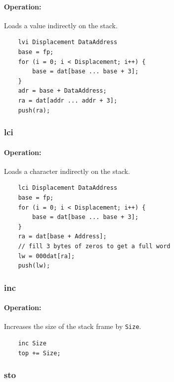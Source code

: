 \paragraph{Operation:}
Loads a value indirectly on the stack.

	\begin{lstlisting}
	lvi Displacement DataAddress
	base = fp;
	for (i = 0; i < Displacement; i++) {
		base = dat[base ... base + 3];
	}
	adr = base + DataAddress;
	ra = dat[addr ... addr + 3];
	push(ra);
	\end{lstlisting}

\subsubsection{lci}

\paragraph{Operation:}
Loads a character indirectly on the stack.

	\begin{lstlisting}
	lci Displacement DataAddress
	base = fp;
	for (i = 0; i < Displacement; i++) {
		base = dat[base ... base + 3];
	}
	ra = dat[base + Address];
	// fill 3 bytes of zeros to get a full word
	lw = 000dat[ra];
	push(lw);
	\end{lstlisting}

\subsubsection{inc}

\paragraph{Operation:}
Increases the size of the stack frame by \lstinline$Size$.

	\begin{lstlisting}
	inc Size
	top += Size;
	\end{lstlisting}

\subsubsection{sto}

